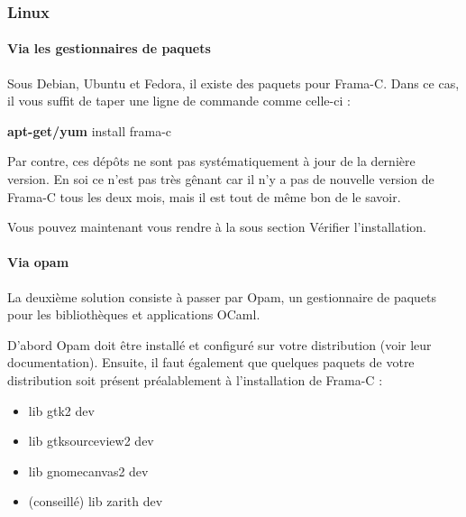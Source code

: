 \documentclass[12pt,francais,]{scrbook}
\newenvironment{Shaded}{}{}
\newcommand{\KeywordTok}[1]{\textcolor[rgb]{0.00,0.44,0.13}{\textbf{{#1}}}}
\newcommand{\NormalTok}[1]{{#1}}
\providecommand{\tightlist}{%
  \setlength{\itemsep}{0pt}\setlength{\parskip}{0pt}}
\begin{document}
\subsubsection{Linux}\label{linux}

\paragraph{Via les gestionnaires de
paquets}\label{via-les-gestionnaires-de-paquets}

Sous Debian, Ubuntu et Fedora, il existe des paquets pour Frama-C. Dans
ce cas, il vous suffit de taper une ligne de commande comme celle-ci :

\begin{footnotesize}\begin{Shaded}
\begin{Highlighting}[]
\KeywordTok{apt-get/yum} \NormalTok{install frama-c}
\end{Highlighting}
\end{Shaded}\end{footnotesize}

Par contre, ces dépôts ne sont pas systématiquement à jour de la
dernière version. En soi ce n'est pas très gênant car il n'y a pas de
nouvelle version de Frama-C tous les deux mois, mais il est tout de même
bon de le savoir.

Vous pouvez maintenant vous rendre à la sous section \og{}Vérifier
l'installation\fg{}.

\paragraph{Via opam}\label{via-opam}

La deuxième solution consiste à passer par Opam, un gestionnaire de
paquets pour les bibliothèques et applications OCaml.

D'abord Opam doit être installé et configuré sur votre distribution
(voir leur documentation). Ensuite, il faut également que quelques
paquets de votre distribution soit présent préalablement à
l'installation de Frama-C :

\begin{itemize}
\tightlist
\item
  lib gtk2 dev
\item
  lib gtksourceview2 dev
\item
  lib gnomecanvas2 dev
\item
  (conseillé) lib zarith dev
\end{itemize}
\end{document}
